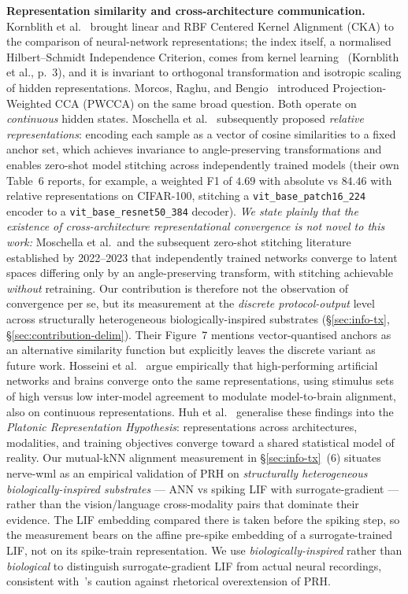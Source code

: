 \documentclass[10pt,twocolumn]{article}
\begin{document}
\textbf{Representation similarity and cross-architecture communication.} Kornblith et al.~\cite{kornblith2019similarity} brought linear and RBF Centered Kernel Alignment (CKA) to the comparison of neural-network representations; the index itself, a normalised Hilbert--Schmidt Independence Criterion, comes from kernel learning~\cite{cortes2012centered} (Kornblith et al., p.~3), and it is invariant to orthogonal transformation and isotropic scaling of hidden representations. Morcos, Raghu, and Bengio~\cite{morcos2018insights} introduced Projection-Weighted CCA (PWCCA) on the same broad question. Both operate on \emph{continuous} hidden states. Moschella et al.~\cite{moschella2022relative} subsequently proposed \emph{relative representations}: encoding each sample as a vector of cosine similarities to a fixed anchor set, which achieves invariance to angle-preserving transformations and enables zero-shot model stitching across independently trained models (their own Table~6 reports, for example, a weighted F1 of $4.69$ with absolute vs $84.46$ with relative representations on CIFAR-100, stitching a \texttt{vit\_base\_patch16\_224} encoder to a \texttt{vit\_base\_resnet50\_384} decoder). \emph{We state plainly that the existence of cross-architecture representational convergence is not novel to this work:} Moschella et al.\ and the subsequent zero-shot stitching literature established by 2022--2023 that independently trained networks converge to latent spaces differing only by an angle-preserving transform, with stitching achievable \emph{without} retraining. Our contribution is therefore not the observation of convergence per se, but its measurement at the \emph{discrete protocol-output} level across structurally heterogeneous biologically-inspired substrates (\S\ref{sec:info-tx}, \S\ref{sec:contribution-delim}). Their Figure~7 mentions vector-quantised anchors as an alternative similarity function but explicitly leaves the discrete variant as future work. Hosseini et al.~\cite{hosseini2024universality} argue empirically that high-performing artificial networks and brains converge onto the same representations, using stimulus sets of high versus low inter-model agreement to modulate model-to-brain alignment, also on continuous representations. Huh et al.~\cite{huh2024platonic} generalise these findings into the \emph{Platonic Representation Hypothesis}: representations across architectures, modalities, and training objectives converge toward a shared statistical model of reality. Our mutual-kNN alignment measurement in \S\ref{sec:info-tx}~(6) situates nerve-wml as an empirical validation of PRH on \emph{structurally heterogeneous biologically-inspired substrates} --- ANN vs spiking LIF with surrogate-gradient --- rather than the vision/language cross-modality pairs that dominate their evidence. The LIF embedding compared there is taken before the spiking step, so the measurement bears on the affine pre-spike embedding of a surrogate-trained LIF, not on its spike-train representation. We use \emph{biologically-inspired} rather than \emph{biological} to distinguish surrogate-gradient LIF from actual neural recordings, consistent with~\cite{aristotelianprh2026}'s caution against rhetorical overextension of PRH. %
\end{document}

